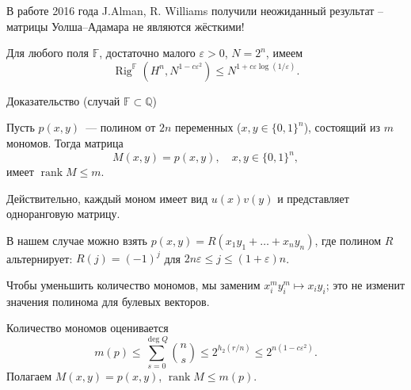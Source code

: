 \documentclass[handout]{beamer}
\renewcommand\le{\leqslant}
\newcommand\eps{\varepsilon}
\DeclareMathOperator{\rank}{rank}
\DeclareMathOperator{\Rig}{Rig}
\begin{document}
\begin{frame}
    В работе 2016 года J.Alman, R. Williams получили неожиданный результат --
    матрицы Уолша--Адамара не являются жёсткими!
    \pause

    \begin{theorem}
        Для любого поля $\mathbb F$, достаточно малого $\eps>0$, 
        $N=2^n$,
        имеем
        $$
        \Rig^{\mathbb{F}}(H^n,N^{1-c\eps^2})\le N^{1+c\eps\log(1/\eps)}.
        $$
    \end{theorem}

\end{frame}

\begin{frame}{Доказательство (случай $\mathbb F\subset\mathbb Q$)}

    Пусть $p(x,y)$~--- полином от $2n$ переменных ($x,y\in\{0,1\}^n$), состоящий из
    $m$ мономов. Тогда матрица
$$
    M(x,y)=p(x,y),\quad x,y\in\{0,1\}^n,
$$
    имеет $\rank M\le m$.\pause

    Действительно, каждый моном имеет вид $u(x)v(y)$ и представляет одноранговую
    матрицу.
\pause\vspace{5pt}

    В нашем случае можно взять $p(x,y)=R(x_1y_1+\ldots+x_ny_n)$,
    где полином $R$ альтернирует: $R(j)=(-1)^j$ для $2n\eps \le j \le
    (1+\eps)n$.

    \pause
    Чтобы уменьшить количество мономов, мы заменим $x_i^my_i^m\mapsto x_iy_i$;
    это не изменит значения полинома для булевых векторов.
    \pause

    Количество мономов оценивается
    $$
        m(p)\le \sum_{s=0}^{\deg Q}\binom{n}{s} \le
        2^{h_2(r/n)}\le 2^{n(1-c\eps^2)}.
    $$
    Полагаем $M(x,y)=p(x,y)$, $\rank M\le m(p)$.
\end{frame}
\end{document}
